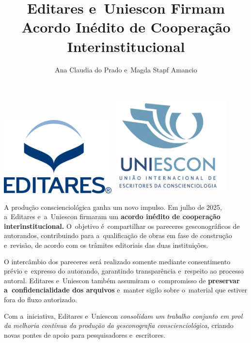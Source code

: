 \documentclass{gescons}
\author{Ana Claudia do Prado e~Magda Stapf Amancio}
\title{Editares e~Uniescon Firmam Acordo Inédito de Cooperação Interinstitucional}
\begin{document}
    \makeentrevistatitle


    
    
\begin{center}
    \includegraphics[height=4cm]{images/Logo-Editares-com-Marca-Registrada.png}
    \hspace{3cm}
    \includegraphics[height=5cm]{images/Logo-UNIESCON-2048x1741.png} 
    
\end{center}
    
    \begin{multicols}{2}

A produção conscienciológica ganha um novo impulso. Em julho de 2025, a~Editares e~a~Uniescon firmaram um \textbf{acordo inédito de cooperação interinstitucional.} O~objetivo é~compartilhar os pareceres gesconográficos de autorandos, contribuindo para a~qualificação de obras em fase de construção e~revisão, de acordo com os trâmites editoriais das duas instituições.

O intercâmbio dos pareceres será realizado somente mediante consentimento prévio e~expresso do autorando, garantindo transparência e~respeito ao processo autoral. Editares e~Uniescon também assumiram o~compromisso de \textbf{preservar a~confidencialidade dos arquivos} e~manter sigilo sobre o~material que estiver fora do fluxo autorizado.

Com a~iniciativa, Editares e~Uniescon \emph{consolidam um trabalho conjunto em prol da melhoria contínua da produção da gesconografia conscienciológica,} criando novas pontes de apoio para pesquisadores e~escritores.



    \end{multicols}
\end{document}
